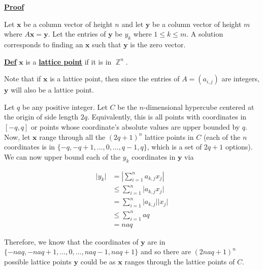 \documentclass[a4paper, 11pt]{book}
\newcommand{\vocab}[1]{\underline{\textbf{#1}}\index{#1}}
\newcommand{\defn}{\underline{\textbf{Def}} }
\newcommand{\proof}{\underline{\textbf{Proof}} }
\DeclareMathOperator{\Z}{\mathbb{Z}}
\begin{document}
\proof{Let $\mathbf{x}$ be a column vector of height $n$ and let $\mathbf{y}$ be a column vector of height $m$ where $A\mathbf{x} = \mathbf{y}$. Let the entries of $\mathbf{y}$ be $y_k$ where $1 \leq k \leq m$. A solution corresponds to finding an $\mathbf{x}$ such that $\mathbf{y}$ is the zero vector.\par


\defn{$\mathbf{x}$ is a \vocab{lattice point} if it is in $\Z^{n}$.}\par

Note that if $\mathbf{x}$ is a lattice point, then since the entries of $A = (a_{i,j})$ are integers, $\mathbf{y}$ will also be a lattice point.\par

Let $q$ be any positive integer. Let $C$ be the $n$-dimensional hypercube centered at the origin of side length $2q$. Equivalently, this is all points with coordinates in $[-q, q]$ or points whose coordinate's absolute values are upper bounded by $q$. Now, let $\mathbf{x}$ range through all the ${(2q+1)}^{n}$ lattice points in $C$ (each of the $n$ coordinates is in $\{-q, -q + 1, \ldots, 0, \ldots, q-1, q\}$, which is a set of $2q+1$ options). We can now upper bound each of the $y_k$ coordinates in $\mathbf{y}$ via

\begin{align*}
    \vert y_k \vert &= \left\vert \sum_{i=1}^{n} a_{k,j}x_j \right\vert \\
                    &\leq \sum_{i=1}^{n} \vert a_{k,j}x_j \vert \\
                    &= \sum_{i=1}^{n} \vert a_{k,j} \vert \vert x_j \vert \\
                    &\leq \sum_{i=1}^{n} aq \\
                    &= naq
\end{align*}

Therefore, we know that the coordinates of $\mathbf{y}$ are in $\{-naq, -naq+1, \ldots, 0, \ldots, naq-1, naq+1\}$ and so there are ${(2naq + 1)}^{n}$ possible lattice points $\mathbf{y}$ could be as $\mathbf{x}$ ranges through the lattice points of $C$.\par

}
\end{document}
